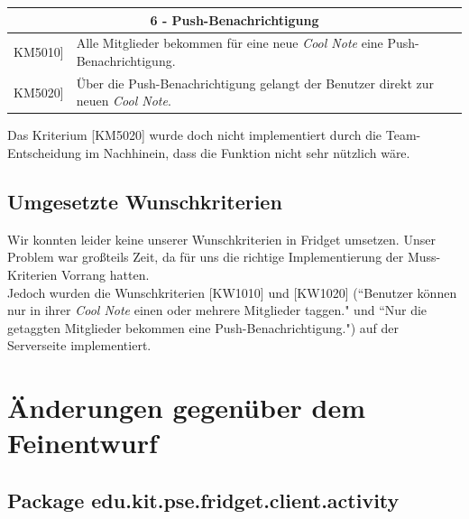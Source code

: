 \documentclass[a4paper]{scrreprt}
\begin{document}
		\vspace{5mm}
		
		\begin{table}[h!]
			\centering
			\label{my-label}
			\begin{tabular}{p{2cm}p{12cm}}
				
				\multicolumn{2}{c}{\textbf{6 - Push-Benachrichtigung}} \\ \hline
				\centering{[}KM5010{]} & Alle Mitglieder bekommen für eine neue \textit{Cool Note} eine Push-Benachrichtigung.\\
				\centering{[}KM5020{]}& Über die Push-Benachrichtigung gelangt der Benutzer direkt zur neuen \textit{Cool Note}.                               \\
				
				\hline
			\end{tabular}
		\end{table}
	 Das Kriterium {[}KM5020{]} wurde doch nicht implementiert durch die Team-Entscheidung im Nachhinein, dass die Funktion nicht sehr nützlich wäre. 
	\section{Umgesetzte Wunschkriterien}
	Wir konnten leider keine unserer Wunschkriterien in Fridget umsetzen. Unser Problem war großteils Zeit, da für uns die richtige Implementierung der Muss-Kriterien Vorrang hatten.\\
	Jedoch wurden die Wunschkriterien  {[}KW1010{]} und {[}KW1020{]} (``Benutzer können nur in ihrer \textit{Cool Note} einen oder mehrere Mitglieder taggen." und ``Nur die getaggten Mitglieder bekommen eine Push-Benachrichtigung.") auf der Serverseite implementiert.\\
	
	\newpage
	
	\chapter{Änderungen gegenüber dem Feinentwurf}
	
	\section{Package edu.kit.pse.fridget.client.activity}
\end{document}
